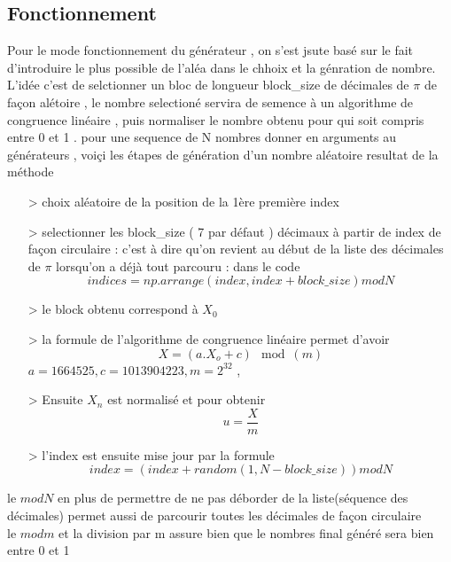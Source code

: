 \subsection{Fonctionnement}
Pour le mode fonctionnement du générateur , on s'est jsute basé sur le fait d'introduire le plus possible de l'aléa dans le chhoix et la génration de nombre. L'idée c'est de selctionner un bloc de longueur block\_size de décimales de $\pi$ de façon alétoire  , le nombre selectioné servira de semence à un algorithme de congruence linéaire , puis normaliser le nombre obtenu pour qui soit compris entre 0 et 1 . %
 pour une sequence de N nombres donner en arguments au générateurs , voiçi  les étapes de génération d'un nombre aléatoire resultat de la méthode 

\begin{itemize}
    \item[>] choix aléatoire de la position de la 1ère première index
    \item[>] selectionner les block\_size ( 7 par défaut ) décimaux à partir de index de façon circulaire : c'est à dire qu'on revient au début de la liste des décimales de $\pi$ lorsqu'on a déjà tout parcouru : dans le code \[ indices = np.arrange(index, index+ block\_size)mod N\]
    \item[>]  le block obtenu correspond à $X_0$
    \item[>] la formule de l'algorithme de congruence linéaire permet d'avoir 
\[ X = (a.X_o + c )\mod(m)\]  $a =1664525 ,c = 1013904223  , m =  2^{32}$ , 
    \item[>] Ensuite $X_n$ est normalisé et pour obtenir \[ u = \frac{X}{m}\]
    \item[>] l'index est ensuite mise jour par la formule \[ index = (index + random(1,N-block\_size) ) mod N\]  
\end{itemize}
    le $modN$ en plus de permettre de ne pas déborder de la liste(séquence des décimales) permet aussi de parcourir toutes les décimales de façon circulaire \\
    le $modm$ et la division par m assure bien que le nombres final généré sera bien entre 0 et 1
